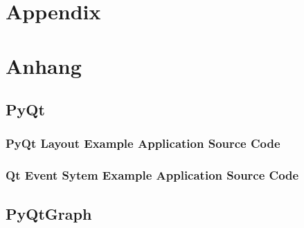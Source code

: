 {\chapter{Appendix}}    %
{\chapter{Anhang}}      %
\label{chap:appendix}


\section{PyQt}
\label{sec:appendix:pyqt}

\setcounter{figure}{0}


\subsection{PyQt Layout Example Application Source Code}



\clearpage


\subsection{Qt Event Sytem Example Application Source Code}



\clearpage




\section{PyQtGraph}
\label{sec:appendix:pyqtgraph}

